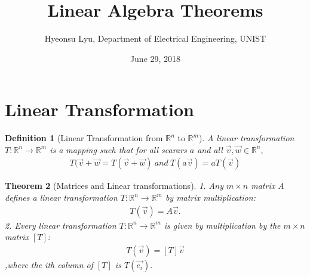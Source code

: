 \documentclass[a4paper,12pt]{article}
\theoremstyle{break}
\newtheorem{theorem}{Theorem}[section]
\newtheorem{definition}[theorem]{Definition}
\begin{document}
\title{Linear Algebra Theorems}
\author{Hyeonsu Lyu, Department of Electrical Engineering, UNIST}
\date{June 29, 2018}
\maketitle

\section{Linear Transformation}
\begin{definition} [Linear Transformation from $\mathbb{R}^n$ to $\mathbb{R}^m$]
A \textit{linear transformation} $T : \mathbb{R}^n\to\mathbb{R}^m$ is a mapping such that for all scarars $\textit{a}$ and all $\overrightarrow{v}, \overrightarrow{w} \in \mathbb{R}^n,$
\begin{align}
    T(\overrightarrow{v}+\overrightarrow{w}=T(\overrightarrow{v}+\overrightarrow{w})\ and\ T(a\overrightarrow{v})=aT(\overrightarrow{v})
\end{align}
\end{definition}

\begin{theorem} [Matrices and Linear transformations]\label{thm:mlt}
1. Any $m\times n$ matrix A defines a linear transformation $T:\mathbb{R}^n\to\mathbb{R}^m$ by matrix multiplication:
\begin{align}
    T(\overrightarrow{v})=A\overrightarrow{v}.
\end{align}
2. Every linear transformation $T:\mathbb{R}^n\to\mathbb{R}^m$ is given by multiplication by the $m\times n$ matrix $[T]$:
\begin{align}
  T(\overrightarrow{v})=[T]\overrightarrow{v}
\end{align}
,where the \textit{i}th column of $[T]$ is $T(\overrightarrow{e_i}).$
\end{theorem}
\end{document}
